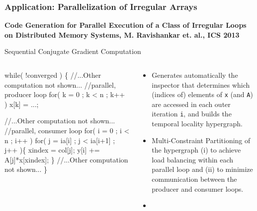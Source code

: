 \documentclass{beamer}
\newcommand{\emphh}[1]{\textcolor{CosGreen}{ #1}}
\begin{document}
\begin{frame}[fragile,t]
  \frametitle{Application: Parallelization of Irregular Arrays}

\begin{scriptsize}
{\bf Code Generation for Parallel Execution of a Class
of Irregular Loops on Distributed Memory Systems, M. Ravishankar et. al., ICS 2013}
\end{scriptsize}

\begin{block}{Sequential Conjugate Gradient Computation}
\begin{columns}
\begin{colorcode}
while( !converged ) \{
    //...Other computation not shown...
    \emphh{//parallel, producer loop}
    for( k = 0 ; k < n ; k++ )  
        x[k] = ...;

    //...Other computation not shown...
    \emphh{//parallel, consumer loop}
    for( i = 0 ; i < n ; i++ ) 
        for( j = ia[i] ; j < ia[i+1] ; j++ )\{
            xindex = col[j];
            y[i] += A[j]*x[xindex];
        \}
    //...Other computation not shown...
\}
\end{colorcode}
\begin{scriptsize}
\begin{itemize}
    \item Generates automatically the inspector that determines
            which (indices of) elements of {\tt x} (and {\tt A})
            are accessed in each outer iteration {\tt i}, and builds
            the temporal locality hypergraph.
    \item Multi-Constraint Partitioning of the hypergraph
            (i) to achieve load balancing within each parallel loop and 
            (ii) to minimize communication between the producer
                    and consumer loops.
    \item 
\end{itemize}
\end{scriptsize}
\end{columns}
\end{block} 

\end{frame}
\end{document}
